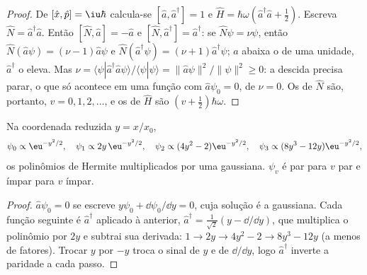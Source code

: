 \begin{proof}
De $[\hat x,\hat p] = \iu\hbar$ calcula-se $[\hat a,\hat a^\dagger] = 1$ e
$\hat H = \hbar\omega(\hat a^\dagger\hat a + \frac12)$. Escreva $\hat N =
\hat a^\dagger\hat a$. Então $[\hat N,\hat a] = -\hat a$ e $[\hat N,\hat
a^\dagger] = \hat a^\dagger$: se $\hat N\psi = \nu\psi$, então $\hat N(\hat
a\psi) = (\nu - 1)\hat a\psi$ e $\hat N(\hat a^\dagger\psi) = (\nu + 1)\hat
a^\dagger\psi$; $\hat a$ abaixa o  de uma unidade, $\hat a^\dagger$ o
eleva. Mas $\nu = \langle\psi|\hat a^\dagger\hat a\psi\rangle/\langle\psi|\psi
\rangle = \|\hat a\psi\|^2/\|\psi\|^2 \ge 0$: a descida precisa parar, o que
só acontece em uma função com $\hat a\psi_0 = 0$, de  $\nu = 0$.
Os  de $\hat N$ são, portanto, $v = 0, 1, 2, \dots$, e os de
$\hat H$ são $(v + \frac12)\hbar\omega$.
\end{proof}

\begin{proposition}\label{prop:b3:quantum-model-systems:oscillator-functions}
Na coordenada reduzida $y = x/x_0$,
\[
\psi_0 \propto \eu^{-y^2/2}, \quad \psi_1 \propto 2y\,\eu^{-y^2/2}, \quad
\psi_2 \propto (4y^2 - 2)\eu^{-y^2/2}, \quad \psi_3 \propto (8y^3 -
12y)\eu^{-y^2/2},
\]
os polinômios de Hermite multiplicados por uma gaussiana. $\psi_v$ é par
para $v$ par e ímpar para $v$ ímpar.
\end{proposition}

\begin{proof}
$\hat a\psi_0 = 0$ se escreve $y\psi_0 + \dd\psi_0/\dd y = 0$, cuja solução é a
gaussiana. Cada função seguinte é $\hat a^\dagger$ aplicado à anterior,
$\hat a^\dagger = \frac{1}{\sqrt2}(y - \dd/\dd y)$, que multiplica o
polinômio por $2y$ e subtrai sua derivada: $1 \to 2y \to 4y^2 - 2 \to
8y^3 - 12y$ (a menos de fatores). Trocar $y$ por $-y$ troca o sinal de $y$
e de $\dd/\dd y$, logo $\hat a^\dagger$ inverte a paridade a cada passo.
\end{proof}

